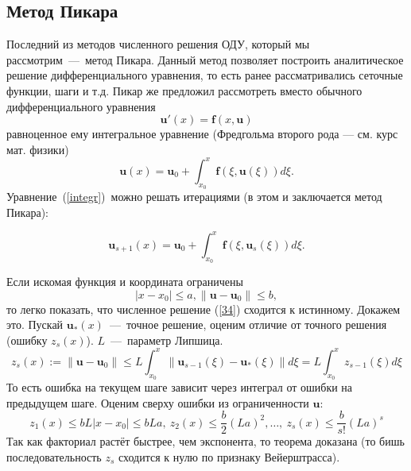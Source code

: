 \documentclass[a4paper,9pt,russian]{article}
\begin{document}
\subsection{Метод Пикара}
    Последний из методов численного решения ОДУ, который мы рассмотрим~---~метод Пикара. Данный метод позволяет построить аналитическое решение дифференциального уравнения, то есть ранее рассматривались сеточные функции, шаги и т.д. Пикар же предложил рассмотреть вместо обычного дифференциального уравнения
    \begin{equation}
     \boldsymbol u'(x) = \boldsymbol f(x, \boldsymbol u)
    \end{equation}
    равноценное ему интегральное уравнение (Фредгольма второго рода --- см. курс мат. физики)
    \begin{equation}\label{integr}
     \boldsymbol u(x) = \boldsymbol u_0 + \int_{x_0}^x \boldsymbol f(\xi, \boldsymbol u(\xi)) d \xi.
    \end{equation}
    Уравнение~(\ref{integr})~можно решать итерациями (в этом и заключается {метод Пикара}):
    
     \begin{equation}\label{34}
     \boldsymbol u_{s+1}(x) = \boldsymbol u_0 + \int_{x_0}^x \boldsymbol f(\xi, \boldsymbol u_s(\xi)) d \xi.
    \end{equation}
    
    Если искомая функция и координата ограничены $$|x - x_0| \le a, \|\boldsymbol u - \boldsymbol u_0\| \le b,$$ то легко показать, что численное решение (\ref{34}) сходится к истинному. Докажем это. Пускай $\boldsymbol u_*(x)$~---~точное решение, оценим отличие от точного решения (ошибку $z_s(x)$). $L$~---~параметр Липшица.
    \begin{equation}
     z_s(x):= \|\boldsymbol u - \boldsymbol u_0\| \le L \int_{x_0}^x \| \boldsymbol u_{s-1}(\xi) - \boldsymbol u_*(\xi)\| d \xi = L \int_{x_0}^x z_{s-1}(\xi) d \xi
    \end{equation}
    То есть ошибка на текущем шаге зависит через интеграл от ошибки на предыдущем шаге. Оценим сверху ошибки из ограниченности $\boldsymbol u$:
    \begin{equation}
     z_1(x) \le b L |x - x_0| \le b L a,\ z_2(x) \le  \frac b2 (L a)^2, \ldots,\ z_s(x) \le  \frac b{s!} (L a)^s
    \end{equation}
    Так как факториал растёт быстрее, чем экспонента, то теорема доказана (то бишь последовательность $z_s$ сходится к нулю по признаку Вейерштрасса).
\end{document}
